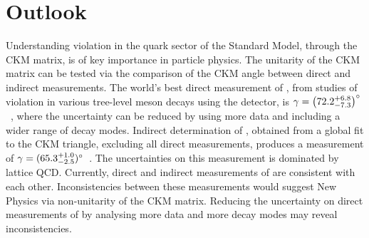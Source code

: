 \section{Outlook}

Understanding \CP violation in the quark sector of the Standard Model, through the CKM matrix, is of key importance in particle physics. The unitarity of the CKM matrix can be tested via the comparison of the CKM angle \Pgamma between direct and indirect measurements. The world's best direct measurement of \Pgamma, from studies of \CP violation in various tree-level \B meson decays using the \lhcb detector, is $\gamma = \left(72.2^{+6.8}_{-7.3}\right)^{\circ}$~\cite{LHCb-PAPER-2016-032}, where the uncertainty can be reduced by using more data and including a wider range of decay modes. Indirect determination of \Pgamma, obtained from a global fit to the CKM triangle, excluding all direct measurements, produces a measurement of $\gamma = (65.3^{+1.0}_{-2.5})^{\circ}$~\cite{CKMFitter}. The uncertainties on this measurement is dominated by lattice QCD. Currently, direct and indirect measurements of \Pgamma are consistent with each other. Inconsistencies between these measurements would suggest New Physics via non-unitarity of the CKM matrix. Reducing the uncertainty on direct measurements of \Pgamma by analysing more data and more decay modes may reveal inconsistencies.

